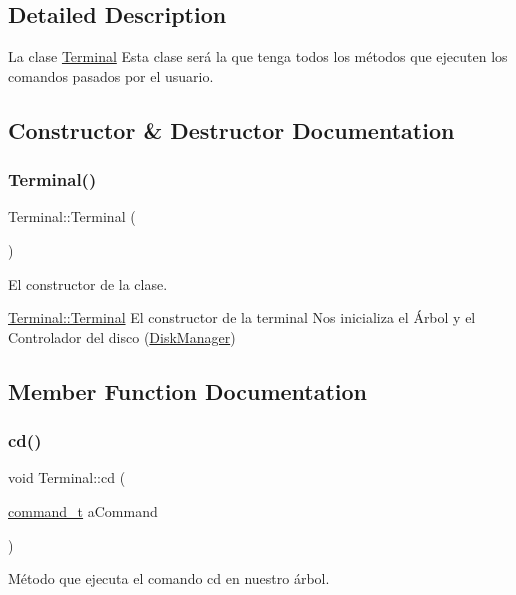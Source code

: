 \subsection{Detailed Description}
La clase \hyperlink{classTerminal}{Terminal} Esta clase será la que tenga todos los métodos que ejecuten los comandos pasados por el usuario. 

\subsection{Constructor \& Destructor Documentation}
\mbox{\label{classTerminal_aa448509b5aa1ece53c3d86385655be0e}} 
\subsubsection{\texorpdfstring{Terminal()}{Terminal()}}
{\footnotesize\ttfamily Terminal\+::\+Terminal (\begin{DoxyParamCaption}{ }\end{DoxyParamCaption})}



El constructor de la clase. 

\hyperlink{classTerminal_aa448509b5aa1ece53c3d86385655be0e}{Terminal\+::\+Terminal} El constructor de la terminal Nos inicializa el Árbol y el Controlador del disco (\hyperlink{classDiskManager}{Disk\+Manager}) 

\subsection{Member Function Documentation}
\mbox{\label{classTerminal_af0648dba26e96c50ac5ea311cda505bc}} 
\subsubsection{\texorpdfstring{cd()}{cd()}}
{\footnotesize\ttfamily void Terminal\+::cd (\begin{DoxyParamCaption}\item[{\hyperlink{structcommand__t}{command\+\_\+t}}]{a\+Command }\end{DoxyParamCaption})}



Método que ejecuta el comando cd en nuestro árbol. 

